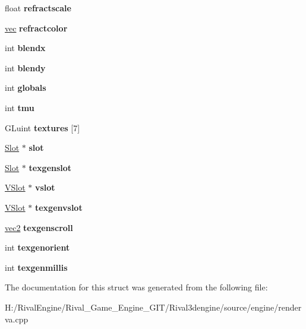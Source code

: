 \begin{DoxyCompactItemize}
float {\bfseries refractscale}
\item 
\mbox{\label{structrenderstate_ad5caa293230aaf0b8a859433e0bfddfb}} 
\hyperlink{structvec}{vec} {\bfseries refractcolor}
\item 
\mbox{\label{structrenderstate_a4e4eeedfdcbe30b01288325dd9f11b19}} 
int {\bfseries blendx}
\item 
\mbox{\label{structrenderstate_afcd5acd40f6b51fc0c99c18d4babe8d5}} 
int {\bfseries blendy}
\item 
\mbox{\label{structrenderstate_a12b4fbcab5da5167cbd630e4ce3e8185}} 
int {\bfseries globals}
\item 
\mbox{\label{structrenderstate_a73cdbd242a2af081ee5a2d3b9ae1a4d0}} 
int {\bfseries tmu}
\item 
\mbox{\label{structrenderstate_ac9ae6c14301a73a5aa7a5b1b9027e659}} 
G\+Luint {\bfseries textures} \mbox{[}7\mbox{]}
\item 
\mbox{\label{structrenderstate_a9945e6275f27c7389e72107694843619}} 
\hyperlink{struct_slot}{Slot} $\ast$ {\bfseries slot}
\item 
\mbox{\label{structrenderstate_ae43a5b75839e3ca9801e45b7a7e1d9a8}} 
\hyperlink{struct_slot}{Slot} $\ast$ {\bfseries texgenslot}
\item 
\mbox{\label{structrenderstate_a651b709caa59dc483e78867cf2029105}} 
\hyperlink{struct_v_slot}{V\+Slot} $\ast$ {\bfseries vslot}
\item 
\mbox{\label{structrenderstate_a4a4371914f8b95914503761db6fb4854}} 
\hyperlink{struct_v_slot}{V\+Slot} $\ast$ {\bfseries texgenvslot}
\item 
\mbox{\label{structrenderstate_ac4f28c9f6366e723ca45e1094daa863d}} 
\hyperlink{structvec2}{vec2} {\bfseries texgenscroll}
\item 
\mbox{\label{structrenderstate_a247d4f8d6305072b3a0725d4b53663cc}} 
int {\bfseries texgenorient}
\item 
\mbox{\label{structrenderstate_a127db3e360ea98a0ea75bdb48cd58806}} 
int {\bfseries texgenmillis}
\end{DoxyCompactItemize}


The documentation for this struct was generated from the following file\+:\begin{DoxyCompactItemize}
\item 
H\+:/\+Rival\+Engine/\+Rival\+\_\+\+Game\+\_\+\+Engine\+\_\+\+G\+I\+T/\+Rival3dengine/source/engine/renderva.\+cpp\end{DoxyCompactItemize}
